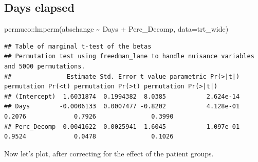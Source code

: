 \documentclass[
]{article}
\newenvironment{Shaded}{\begin{snugshade}}{\end{snugshade}}
\newcommand{\AttributeTok}[1]{\textcolor[rgb]{0.77,0.63,0.00}{#1}}
\newcommand{\FunctionTok}[1]{\textcolor[rgb]{0.00,0.00,0.00}{#1}}
\newcommand{\NormalTok}[1]{#1}
\newcommand{\SpecialCharTok}[1]{\textcolor[rgb]{0.00,0.00,0.00}{#1}}
\begin{document}
\hypertarget{days-elapsed}{%
\subsection{Days elapsed}\label{days-elapsed}}

\begin{Shaded}
\begin{Highlighting}[]
\NormalTok{permuco}\SpecialCharTok{::}\FunctionTok{lmperm}\NormalTok{(abschange }\SpecialCharTok{\textasciitilde{}}\NormalTok{ Days }\SpecialCharTok{+}\NormalTok{ Perc\_Decomp, }\AttributeTok{data=}\NormalTok{trt\_wide)}
\end{Highlighting}
\end{Shaded}

\begin{verbatim}
## Table of marginal t-test of the betas
## Permutation test using freedman_lane to handle nuisance variables and 5000 permutations.
##               Estimate Std. Error t value parametric Pr(>|t|) permutation Pr(<t) permutation Pr(>t) permutation Pr(>|t|)
## (Intercept)  1.6031874  0.1994382  8.0385           2.624e-14                                                           
## Days        -0.0006133  0.0007477 -0.8202           4.128e-01             0.2076             0.7926               0.3990
## Perc_Decomp  0.0041622  0.0025941  1.6045           1.097e-01             0.9524             0.0478               0.1026
\end{verbatim}

Now let's plot, after correcting for the effect of the patient groups.
\end{document}
